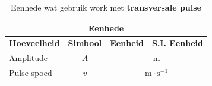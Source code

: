         \label{m38802*cid9}
\begin{table}[H]
\begin{center}
\begin{tabular}{|l|c|c|c|}\hline \hline 
\multicolumn{4}{|c|}{\textbf{Eenhede}}\\ \hline \hline
\textbf{Hoeveelheid} & \textbf{Simbool} & \textbf{Eenheid} & \textbf{S.I. Eenheid}  \\ \hline
Amplitude & $A$ & \multicolumn{2}{c|}{m} \\ \hline
Pulse spoed & $v$ & \multicolumn{2}{c|}{$\text{m} \cdot \text{s}^{-1}$} \\ \hline
\end{tabular}
\end{center}
\caption{Eenhede wat gebruik work met \textbf{transversale pulse} }
\label{table:electricity::units}
\end{table}

